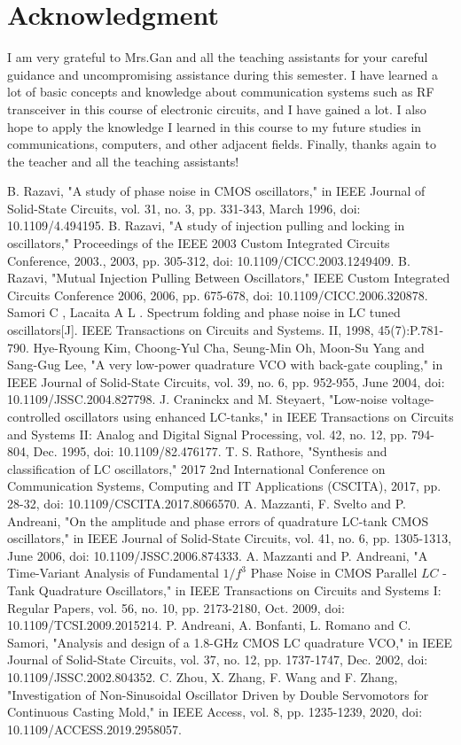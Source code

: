 \documentclass[conference]{IEEEtran}
\begin{document}
\section*{Acknowledgment}
I am very grateful to Mrs.Gan and all the teaching assistants for your careful guidance and uncompromising assistance during this semester. I have learned a lot of basic concepts and knowledge about communication systems such as RF transceiver in this course of electronic circuits, and I have gained a lot. I also hope to apply the knowledge I learned in this course to my future studies in communications, computers, and other adjacent fields. Finally, thanks again to the teacher and all the teaching assistants!


\begin{thebibliography}{00}
 B. Razavi, "A study of phase noise in CMOS oscillators," in IEEE Journal of Solid-State Circuits, vol. 31, no. 3, pp. 331-343, March 1996, doi: 10.1109/4.494195.
 B. Razavi, "A study of injection pulling and locking in oscillators," Proceedings of the IEEE 2003 Custom Integrated Circuits Conference, 2003., 2003, pp. 305-312, doi: 10.1109/CICC.2003.1249409. 
B. Razavi, "Mutual Injection Pulling Between Oscillators," IEEE Custom Integrated Circuits Conference 2006, 2006, pp. 675-678, doi: 10.1109/CICC.2006.320878.
 Samori C , Lacaita A L . Spectrum folding and phase noise in LC tuned oscillators[J]. IEEE Transactions on Circuits and Systems. II, 1998, 45(7):P.781-790.
 Hye-Ryoung Kim, Choong-Yul Cha, Seung-Min Oh, Moon-Su Yang and Sang-Gug Lee, "A very low-power quadrature VCO with back-gate coupling," in IEEE Journal of Solid-State Circuits, vol. 39, no. 6, pp. 952-955, June 2004, doi: 10.1109/JSSC.2004.827798.
 J. Craninckx and M. Steyaert, "Low-noise voltage-controlled oscillators using enhanced LC-tanks," in IEEE Transactions on Circuits and Systems II: Analog and Digital Signal Processing, vol. 42, no. 12, pp. 794-804, Dec. 1995, doi: 10.1109/82.476177.
 T. S. Rathore, "Synthesis and classification of LC oscillators," 2017 2nd International Conference on Communication Systems, Computing and IT Applications (CSCITA), 2017, pp. 28-32, doi: 10.1109/CSCITA.2017.8066570.
 A. Mazzanti, F. Svelto and P. Andreani, "On the amplitude and phase errors of quadrature LC-tank CMOS oscillators," in IEEE Journal of Solid-State Circuits, vol. 41, no. 6, pp. 1305-1313, June 2006, doi: 10.1109/JSSC.2006.874333.
 A. Mazzanti and P. Andreani, "A Time-Variant Analysis of Fundamental $1/f^{3}$ Phase Noise in CMOS Parallel $LC$ -Tank Quadrature Oscillators," in IEEE Transactions on Circuits and Systems I: Regular Papers, vol. 56, no. 10, pp. 2173-2180, Oct. 2009, doi: 10.1109/TCSI.2009.2015214.
 P. Andreani, A. Bonfanti, L. Romano and C. Samori, "Analysis and design of a 1.8-GHz CMOS LC quadrature VCO," in IEEE Journal of Solid-State Circuits, vol. 37, no. 12, pp. 1737-1747, Dec. 2002, doi: 10.1109/JSSC.2002.804352.
 C. Zhou, X. Zhang, F. Wang and F. Zhang, "Investigation of Non-Sinusoidal Oscillator Driven by Double Servomotors for Continuous Casting Mold," in IEEE Access, vol. 8, pp. 1235-1239, 2020, doi: 10.1109/ACCESS.2019.2958057.


\end{thebibliography}
\vspace{12pt}
\end{document}
